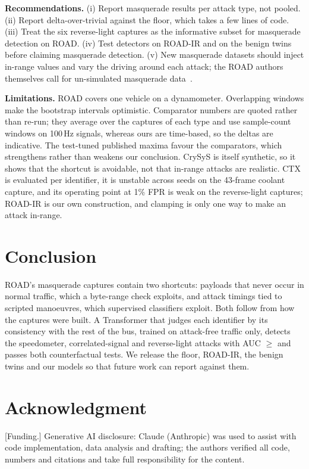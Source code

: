 \documentclass[conference]{IEEEtran}
\begin{document}
\textbf{Recommendations.} (i) Report masquerade results per attack type, not pooled. (ii) Report delta-over-trivial against the \Ttwo{} floor, which takes a few lines of code. (iii) Treat the six reverse-light captures as the informative subset for masquerade detection on ROAD. (iv) Test detectors on ROAD-IR and on the benign twins before claiming masquerade detection. (v) New masquerade datasets should inject in-range values and vary the driving around each attack; the ROAD authors themselves call for un-simulated masquerade data~\cite{verma2024}.

\textbf{Limitations.} ROAD covers one vehicle on a dynamometer. Overlapping windows make the bootstrap intervals optimistic. Comparator numbers are quoted rather than re-run; they average over the captures of each type and use sample-count windows on 100\,Hz signals, whereas ours are time-based, so the deltas are indicative. The test-tuned published maxima favour the comparators, which strengthens rather than weakens our conclusion. CrySyS is itself synthetic, so it shows that the shortcut is avoidable, not that in-range attacks are realistic. CTX is evaluated per identifier, it is unstable across seeds on the 43-frame coolant capture, and its operating point at 1\% FPR is weak on the reverse-light captures; ROAD-IR is our own construction, and clamping is only one way to make an attack in-range.

\section{Conclusion}
ROAD's masquerade captures contain two shortcuts: payloads that never occur in normal traffic, which a byte-range check exploits, and attack timings tied to scripted manoeuvres, which supervised classifiers exploit. Both follow from how the captures were built. A Transformer that judges each identifier by its consistency with the rest of the bus, trained on attack-free traffic only, detects the speedometer, correlated-signal and reverse-light attacks with AUC $\geq$\CtxFourMin{} and passes both counterfactual tests. We release the floor, ROAD-IR, the benign twins and our models so that future work can report against them.

\section*{Acknowledgment}
[Funding.] Generative AI disclosure: Claude (Anthropic) was used to assist with code implementation, data analysis and drafting; the authors verified all code, numbers and citations and take full responsibility for the content.
\end{document}
